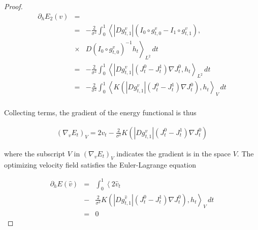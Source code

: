 \documentclass[final, paper=letter,5p,times,twocolumn]{elsarticle}
\theoremstyle{definition}
\begin{document}
\begin{proof}
    \begin{equation*}
    \begin{array}{lcl}
      \partial_{h} E_{2}(v) & = & \\
      & = & - \frac{2}{\sigma^{2}} \int_{0}^{1} \left< |D g_{t,1}^{v}| (I_{0} \circ g_{t,0}^{v} - I_{1} \circ g_{t,1}^{v}), \right . \\  
      & \times & \left. D \left( I_{0} \circ g_{t,0}^{v} \right)^{-1} h_{t} \right>_{L^{2}} \, dt \\
      & = & - \frac{2}{\sigma^{2}} \int_{0}^{1} \left< |D g_{t,1}^{v}| (J_{t}^{0}  - J_{t}^{1}) \nabla J_{t}^{0}, h_{t} \right>_{L^{2}} \, dt \\
      & = & - \frac{2}{\sigma^{2}} \int_{0}^{1} \left< K \left( |D g_{t,1}^{v}| (J_{t}^{0}  - J_{t}^{1}) \nabla J_{t}^{0} \right), h_{t} \right>_{V} \, dt \\
      \end{array}
    \end{equation*}
    
    Collecting terms, the gradient of the energy functional is thus

    \begin{equation}
      \begin{array}{lcl}
        \left( \nabla_{v} E_{t} \right)_{V} = 2v_{t} - \frac{2}{\sigma^{2}} K \left( |D g_{t,1}^{v}| (J_{t}^{0}  - J_{t}^{1}) \nabla J_{t}^{0} \right)
      \end{array}
      \label{gradient_descent}
    \end{equation}

    where the subscript $V$ in $\left( \nabla_{v} E_{t} \right)_{V}$ indicates the gradient is in the space $V$. The optimizing velocity field satisfies the Euler-Lagrange equation

     \begin{equation}
      \begin{array}{lcl}
        \partial_{h}E(\hat{v}) & = & \int_{0}^{1} \left< 2\hat{v}_{t} \right .\\ 
        & - & \left. \frac{2}{\sigma^{2}} K \left( |D g_{t,1}^{\hat{v}}| (J_{t}^{0}  - J_{t}^{1}) \nabla J_{t}^{0} \right), h_{t} \right>_{V} \, dt \\
        & = & 0
      \end{array}
      \label{gradient_descent}
    \end{equation}
   
    
\end{proof}
\end{document}
